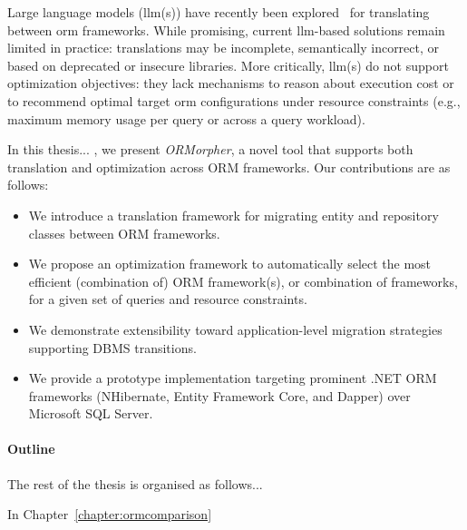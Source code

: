 Large language models (\acrshort{llm}(s)) have recently been explored~\cite{TODO} for translating between \acrshort{orm} frameworks. While promising, current \acrshort{llm}-based solutions remain limited in practice: translations may be incomplete, semantically incorrect, or based on deprecated or insecure libraries. More critically, \acrshort{llm}(s) do not support optimization objectives: they lack mechanisms to reason about execution cost or to recommend optimal target \acrshort{orm} configurations under resource constraints (e.g., maximum memory usage per query or across a query workload).

In this thesis... , we present \emph{ORMorpher}, a novel tool that supports both translation and optimization across ORM frameworks. Our contributions are as follows:
\begin{itemize}
    \item We introduce a translation framework for migrating entity and repository classes between ORM frameworks.
    \item We propose an optimization framework to automatically select the most efficient (combination of) ORM framework(s), or combination of frameworks, for a given set of queries and resource constraints.
    \item We demonstrate extensibility toward application-level migration strategies supporting DBMS transitions.
    \item We provide a prototype implementation targeting prominent .NET ORM frameworks (NHibernate, Entity Framework Core, and Dapper) over Microsoft SQL Server.
\end{itemize}

\paragraph{Outline} The rest of the thesis is organised as follows...

In Chapter~\ref{chapter:ormcomparison}